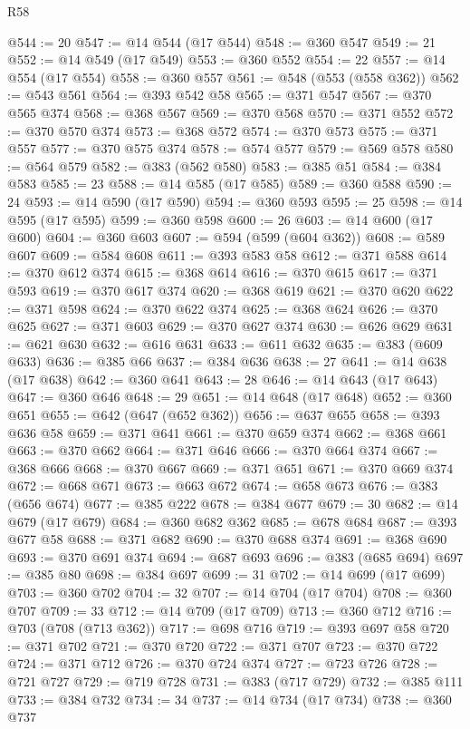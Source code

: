 \begin{lexlean}{R58}
\begin{coremodule}
@544 := 20
@547 := @14 @544 (@17 @544)
@548 := @360 @547
@549 := 21
@552 := @14 @549 (@17 @549)
@553 := @360 @552
@554 := 22
@557 := @14 @554 (@17 @554)
@558 := @360 @557
@561 := @548 (@553 (@558 @362))
@562 := @543 @561
@564 := @393 @542 @58
@565 := @371 @547
@567 := @370 @565 @374
@568 := @368 @567
@569 := @370 @568
@570 := @371 @552
@572 := @370 @570 @374
@573 := @368 @572
@574 := @370 @573
@575 := @371 @557
@577 := @370 @575 @374
@578 := @574 @577
@579 := @569 @578
@580 := @564 @579
@582 := @383 (@562 @580)
@583 := @385 @51
@584 := @384 @583
@585 := 23
@588 := @14 @585 (@17 @585)
@589 := @360 @588
@590 := 24
@593 := @14 @590 (@17 @590)
@594 := @360 @593
@595 := 25
@598 := @14 @595 (@17 @595)
@599 := @360 @598
@600 := 26
@603 := @14 @600 (@17 @600)
@604 := @360 @603
@607 := @594 (@599 (@604 @362))
@608 := @589 @607
@609 := @584 @608
@611 := @393 @583 @58
@612 := @371 @588
@614 := @370 @612 @374
@615 := @368 @614
@616 := @370 @615
@617 := @371 @593
@619 := @370 @617 @374
@620 := @368 @619
@621 := @370 @620
@622 := @371 @598
@624 := @370 @622 @374
@625 := @368 @624
@626 := @370 @625
@627 := @371 @603
@629 := @370 @627 @374
@630 := @626 @629
@631 := @621 @630
@632 := @616 @631
@633 := @611 @632
@635 := @383 (@609 @633)
@636 := @385 @66
@637 := @384 @636
@638 := 27
@641 := @14 @638 (@17 @638)
@642 := @360 @641
@643 := 28
@646 := @14 @643 (@17 @643)
@647 := @360 @646
@648 := 29
@651 := @14 @648 (@17 @648)
@652 := @360 @651
@655 := @642 (@647 (@652 @362))
@656 := @637 @655
@658 := @393 @636 @58
@659 := @371 @641
@661 := @370 @659 @374
@662 := @368 @661
@663 := @370 @662
@664 := @371 @646
@666 := @370 @664 @374
@667 := @368 @666
@668 := @370 @667
@669 := @371 @651
@671 := @370 @669 @374
@672 := @668 @671
@673 := @663 @672
@674 := @658 @673
@676 := @383 (@656 @674)
@677 := @385 @222
@678 := @384 @677
@679 := 30
@682 := @14 @679 (@17 @679)
@684 := @360 @682 @362
@685 := @678 @684
@687 := @393 @677 @58
@688 := @371 @682
@690 := @370 @688 @374
@691 := @368 @690
@693 := @370 @691 @374
@694 := @687 @693
@696 := @383 (@685 @694)
@697 := @385 @80
@698 := @384 @697
@699 := 31
@702 := @14 @699 (@17 @699)
@703 := @360 @702
@704 := 32
@707 := @14 @704 (@17 @704)
@708 := @360 @707
@709 := 33
@712 := @14 @709 (@17 @709)
@713 := @360 @712
@716 := @703 (@708 (@713 @362))
@717 := @698 @716
@719 := @393 @697 @58
@720 := @371 @702
@721 := @370 @720
@722 := @371 @707
@723 := @370 @722
@724 := @371 @712
@726 := @370 @724 @374
@727 := @723 @726
@728 := @721 @727
@729 := @719 @728
@731 := @383 (@717 @729)
@732 := @385 @111
@733 := @384 @732
@734 := 34
@737 := @14 @734 (@17 @734)
@738 := @360 @737

\end{coremodule}
\end{lexlean}

